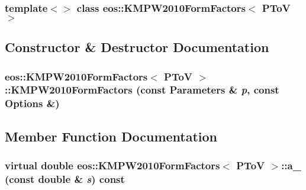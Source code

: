 \subsubsection*{template$<$$>$ class eos::KMPW2010FormFactors$<$ PToV $>$}



\subsection{Constructor \& Destructor Documentation}
\hypertarget{classeos_1_1KMPW2010FormFactors_3_01PToV_01_4_a8aa8b61807bd884b832528421a107b75}{
\subsubsection[{KMPW2010FormFactors}]{\setlength{\rightskip}{0pt plus 5cm}eos::KMPW2010FormFactors$<$ {\bf PToV} $>$::KMPW2010FormFactors (const {\bf Parameters} \& {\em p}, \/  const {\bf Options} \&)}}
\label{classeos_1_1KMPW2010FormFactors_3_01PToV_01_4_a8aa8b61807bd884b832528421a107b75}


\subsection{Member Function Documentation}
\hypertarget{classeos_1_1KMPW2010FormFactors_3_01PToV_01_4_a05b86cc4ef009a2f08fb91595ec9dd0c}{
\subsubsection[{a\_\-0}]{\setlength{\rightskip}{0pt plus 5cm}virtual double eos::KMPW2010FormFactors$<$ {\bf PToV} $>$::a\_ (const double \& {\em s}) const}}
\label{classeos_1_1KMPW2010FormFactors_3_01PToV_01_4_a05b86cc4ef009a2f08fb91595ec9dd0c}


